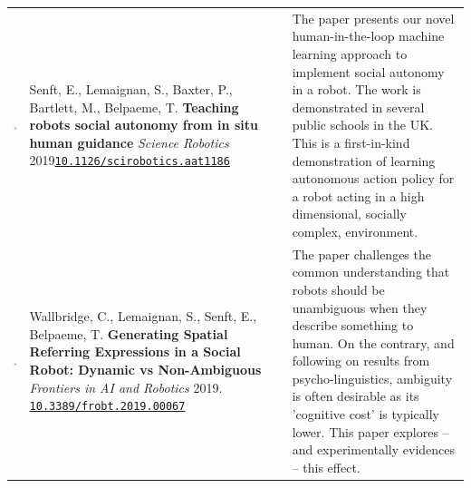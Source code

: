 \documentclass[11pt]{report}
\begin{document}
\begin{tabular}{p{1.8cm}p{6cm}p{7cm}}

    \vspace{0cm}\includegraphics[width=2cm]{thumbs/2019-science.jpg} & Senft, E.,
    Lemaignan, S., Baxter, P., Bartlett, M., Belpaeme, T.
    \textbf{Teaching robots social autonomy from in situ human guidance}
    \newline \textit{Science Robotics} 2019\newline \texttt{\href{https://doi.org/10.1126/scirobotics.aat1186}{10.1126/scirobotics.aat1186}}
    & \small The paper presents our novel human-in-the-loop machine learning approach
    to implement social autonomy in a robot. The work is demonstrated in several
    public schools in the UK. This is a first-in-kind demonstration of learning
    autonomous action policy for a robot acting in a high dimensional, socially complex,
    environment. \\


    \vspace{0cm}\includegraphics[width=2cm]{thumbs/2019-science.jpg} &

    Wallbridge, C., Lemaignan, S., Senft, E., Belpaeme, T.  \textbf{Generating
    Spatial Referring Expressions in a Social Robot: Dynamic vs Non-Ambiguous} 
    \newline \textit{Frontiers in AI and Robotics} 2019.
    \newline \texttt{\href{https://doi.org/10.3389/frobt.2019.00067}{10.3389/frobt.2019.00067}}
    & \small The paper challenges the common understanding that robots should be
    unambiguous when they describe something to human. On the contrary, and
    following on results from psycho-linguistics, ambiguity is often desirable
    as its 'cognitive cost' is typically lower. This paper explores -- and
    experimentally evidences -- this effect. \\


\end{tabular}
\end{document}
